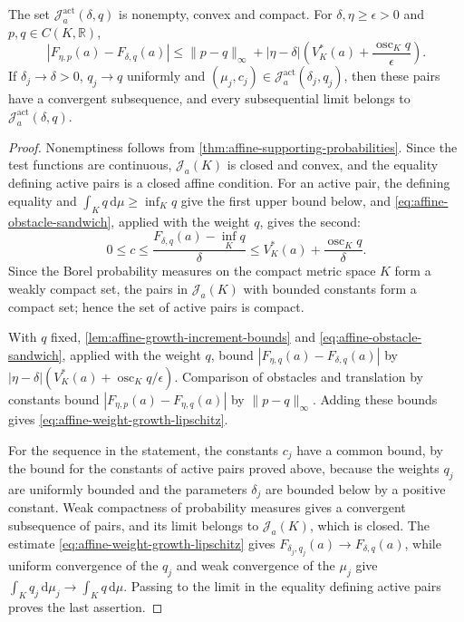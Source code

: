 \begin{lemma}\label{lem:affine-active-support-stability}
The set $\mathcal J^{\mathrm{act}}_a(\delta,q)$ is nonempty, convex and compact. For $\delta,\eta\geq\epsilon>0$ and $p,q\in C(K,\mathbb R)$,
\begin{equation}\label{eq:affine-weight-growth-lipschitz}
 |F_{\eta,p}(a)-F_{\delta,q}(a)|
 \leq\|p-q\|_\infty+
 |\eta-\delta|\left(V_K^*(a)+
                    \frac{\operatorname{osc}_Kq}{\epsilon}\right).
\end{equation}
If $\delta_j\to\delta>0$, $q_j\to q$ uniformly and $(\mu_j,c_j)\in\mathcal J^{\mathrm{act}}_a(\delta_j,q_j)$, then these pairs have a convergent subsequence, and every subsequential limit belongs to $\mathcal J^{\mathrm{act}}_a(\delta,q)$.
\end{lemma}
\begin{proof}
Nonemptiness follows from \cref{thm:affine-supporting-probabilities}. Since the test functions are continuous, $\mathcal J_a(K)$ is closed and convex, and the equality defining active pairs is a closed affine condition. For an active pair, the defining equality and $\int_Kq\,\mathrm{d}\mu\geq\inf_Kq$ give the first upper bound below, and \eqref{eq:affine-obstacle-sandwich}, applied with the weight $q$, gives the second:
\[
 0\leq c\leq\frac{F_{\delta,q}(a)-\inf_Kq}{\delta}
 \leq V_K^*(a)+\frac{\operatorname{osc}_Kq}{\delta}.
\]
Since the Borel probability measures on the compact metric space $K$ form a weakly compact set, the pairs in $\mathcal J_a(K)$ with bounded constants form a compact set; hence the set of active pairs is compact.

With $q$ fixed, \cref{lem:affine-growth-increment-bounds} and \eqref{eq:affine-obstacle-sandwich}, applied with the weight $q$, bound $|F_{\eta,q}(a)-F_{\delta,q}(a)|$ by $|\eta-\delta|(V_K^*(a)+\operatorname{osc}_Kq/\epsilon)$. Comparison of obstacles and translation by constants bound $|F_{\eta,p}(a)-F_{\eta,q}(a)|$ by $\|p-q\|_\infty$. Adding these bounds gives \eqref{eq:affine-weight-growth-lipschitz}.

For the sequence in the statement, the constants $c_j$ have a common bound, by the bound for the constants of active pairs proved above, because the weights $q_j$ are uniformly bounded and the parameters $\delta_j$ are bounded below by a positive constant. Weak compactness of probability measures gives a convergent subsequence of pairs, and its limit belongs to $\mathcal J_a(K)$, which is closed. The estimate \eqref{eq:affine-weight-growth-lipschitz} gives $F_{\delta_j,q_j}(a)\to F_{\delta,q}(a)$, while uniform convergence of the $q_j$ and weak convergence of the $\mu_j$ give $\int_Kq_j\,\mathrm{d}\mu_j\to\int_Kq\,\mathrm{d}\mu$. Passing to the limit in the equality defining active pairs proves the last assertion.
\end{proof}

